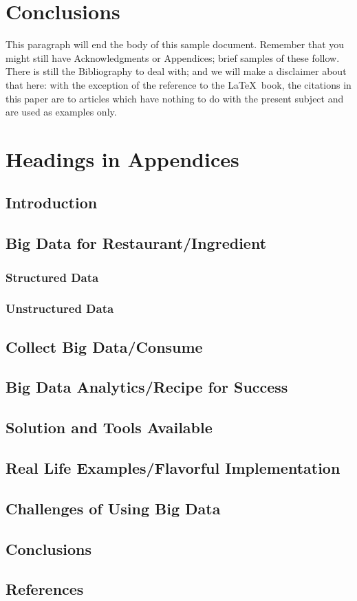 \documentclass[sigconf]{acmart}
\begin{document}
\section{Conclusions}

This paragraph will end the body of this sample document.  Remember
that you might still have Acknowledgments or Appendices; brief samples
of these follow.  There is still the Bibliography to deal with; and we
will make a disclaimer about that here: with the exception of the
reference to the \LaTeX\ book, the citations in this paper are to
articles which have nothing to do with the present subject and are
used as examples only.



\appendix

\section{Headings in Appendices}

\subsection{Introduction}
\subsection{Big Data for Restaurant/Ingredient}
\subsubsection{Structured Data}
\subsubsection{Unstructured Data}
\subsection{Collect Big Data/Consume}
\subsection{Big Data Analytics/Recipe for Success}
\subsection{Solution and Tools Available}
\subsection{Real Life Examples/Flavorful Implementation}
\subsection{Challenges of Using Big Data}
\subsection{Conclusions}
\subsection{References}



 
\end{document}
